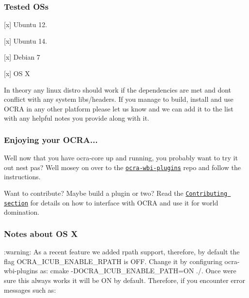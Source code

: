 \subsubsection*{Tested OS\textquotesingle{}s}


\begin{DoxyItemize}
\item \mbox{[}x\mbox{]} Ubuntu 12.
\item \mbox{[}x\mbox{]} Ubuntu 14.
\item \mbox{[}x\mbox{]} Debian 7
\item \mbox{[}x\mbox{]} OS X
\end{DoxyItemize}

In theory any linux distro should work if the dependencies are met and don\textquotesingle{}t conflict with any system libs/headers. If you manage to build, install and use O\+C\+RA in any other platform please let us know and we can add it to the list with any helpful notes you provide along with it.

\subsubsection*{Enjoying your O\+C\+RA...}

Well now that you have {\ttfamily ocra-\/core} up and running, you probably want to try it out n\textquotesingle{}est pas? Well mosey on over to the \href{https://github.com/ocra-recipes/ocra-wbi-plugins}{\tt ocra-\/wbi-\/plugins} repo and follow the instructions.

Want to contribute? Maybe build a plugin or two? Read the \href{#Contributing}{\tt Contributing section} for details on how to interface with O\+C\+RA and use it for world domination.

\subsubsection*{Notes about OS X}

\+:warning\+: As a recent feature we added rpath support, therefore, by default the flag {\ttfamily O\+C\+R\+A\+\_\+\+I\+C\+U\+B\+\_\+\+E\+N\+A\+B\+L\+E\+\_\+\+R\+P\+A\+TH} is {\ttfamily O\+FF}. Change it by configuring {\ttfamily ocra-\/wbi-\/plugins} as\+: {\ttfamily cmake -\/\+D\+O\+C\+R\+A\+\_\+\+I\+C\+U\+B\+\_\+\+E\+N\+A\+B\+L\+E\+\_\+\+P\+A\+TH=ON ./}. Once we\textquotesingle{}re sure this \textquotesingle{}\textquotesingle{}always\textquotesingle{}\textquotesingle{} works it will be {\ttfamily ON} by default. Therefore, if you encounter error messages such as\+:


